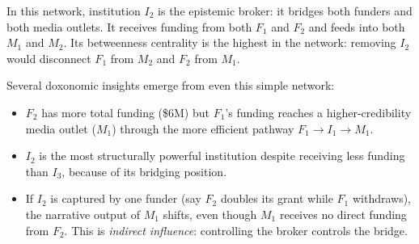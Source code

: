 \begin{center}
\end{center}

In this network, institution $I_2$ is the epistemic broker: it bridges both funders and both media outlets.
It receives funding from both $F_1$ and $F_2$ and feeds into both $M_1$ and $M_2$.
Its betweenness centrality is the highest in the network: removing $I_2$ would disconnect $F_1$ from $M_2$ and $F_2$ from $M_1$.

\begin{remark}
\label{rem:interpreting-diagram}
Several doxonomic insights emerge from even this simple network:
\begin{itemize}[nosep]
  \item $F_2$ has more total funding (\$6M) but $F_1$'s funding reaches a higher-credibility media outlet ($M_1$) through the more efficient pathway $F_1 \to I_1 \to M_1$.
  \item $I_2$ is the most structurally powerful institution despite receiving less funding than $I_3$, because of its bridging position.
  \item If $I_2$ is captured by one funder (say $F_2$ doubles its grant while $F_1$ withdraws), the narrative output of $M_1$ shifts, even though $M_1$ receives no direct funding from $F_2$.
  This is \emph{indirect influence}: controlling the broker controls the bridge.
\end{itemize}
\end{remark}


